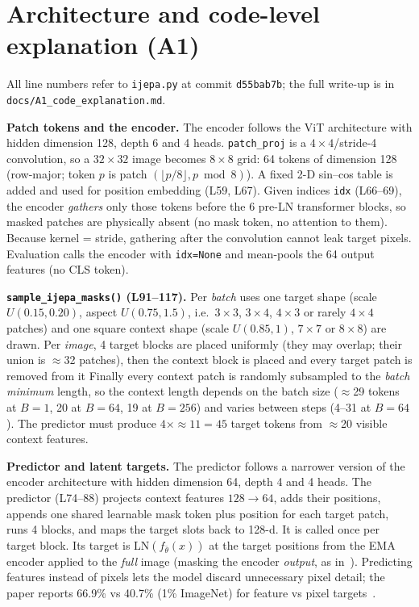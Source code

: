 \documentclass[10pt]{article}
\begin{document}
\section{Architecture and code-level explanation (A1)}
\label{sec:arch}
All line numbers refer to \texttt{ijepa.py} at commit \texttt{d55bab7b}; the full write-up is in
\texttt{docs/A1\_code\_explanation.md}.

\textbf{Patch tokens and the encoder.} The encoder follows the ViT architecture with hidden dimension 128, depth 6 and 4 heads. 
\texttt{patch\_proj} is a $4{\times}4$/stride-4 convolution, so a $32{\times}32$
image becomes $8{\times}8$ grid: 64 tokens of dimension 128 (row-major; token $p$ is patch $(\lfloor p/8\rfloor, p \bmod 8)$). A fixed 2-D
sin--cos table is added and used for position embedding (L59, L67). Given indices \texttt{idx} (L66--69), the encoder \emph{gathers} only those tokens
before the 6 pre-LN transformer blocks, so masked patches are physically absent (no mask token, no attention to them).
Because kernel = stride, gathering after the convolution cannot leak target pixels. Evaluation calls the
encoder with \texttt{idx=None} and mean-pools the 64 output features (no CLS token).

\textbf{\texttt{sample\_ijepa\_masks()} (L91--117).} Per \emph{batch} uses one target shape (scale $U(0.15,0.20)$, aspect
$U(0.75,1.5)$, i.e.\ $3{\times}3$, $3{\times}4$, $4{\times}3$ or rarely $4{\times}4$ patches) and one square context shape
(scale $U(0.85,1)$, $7{\times}7$ or $8{\times}8$) are drawn. Per \emph{image}, 4 target blocks are placed uniformly (they may
overlap; their union is $\approx$32 patches), then the context block is placed and every target patch is removed from it
Finally every context patch is randomly subsampled to the \emph{batch minimum} length, so the context
length depends on the batch size ($\approx$29 tokens at $B{=}1$, 20 at $B{=}64$, 19 at $B{=}256$) and varies between steps
(4--31 at $B{=}64$). The predictor must produce $4{\times}\approx 11{=}45$ target tokens from $\approx$20 visible context features.

\textbf{Predictor and latent targets.} The predictor follows a narrower version of the encoder architecture with hidden dimension 64, depth 4 and 4 heads. 
The predictor (L74--88) projects context features $128{\to}64$, adds their positions,
appends one shared learnable mask token plus position for each target patch, runs 4 blocks, and maps the target slots back
to 128-d. It is called once per target block. Its target is $\mathrm{LN}(f_{\bar\theta}(x))$ at the target positions from
the EMA encoder applied to the \emph{full} image (masking the encoder \emph{output}, as in~\cite[Tab.~11]{assran2023ijepa}).
Predicting features instead of pixels lets the model discard unnecessary pixel detail; the paper reports 66.9\% vs
40.7\% (1\% ImageNet) for feature vs pixel targets~\cite[Tab.~7]{assran2023ijepa}.
\end{document}
